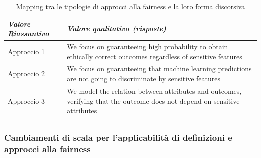      \begin{longtable}{| p{} | p{} |} 
      
      \hline\textbf{\textit{Valore Riassuntivo}} & \textbf{\textit{Valore qualitativo (risposte)}}
       
        
        \\ \hline
        \rowcolor{Gray}
        Approccio 1       
        
        &   We focus on guaranteeing high probability to obtain ethically correct outcomes regardless of sensitive features


        
        \\ \hline


        Approccio 2      
        
        &  We focus on guaranteeing that machine learning predictions are not going to discriminate by sensitive features





        \\ \hline
        \rowcolor{Gray}
        Approccio 3      
        
        &  We model the relation between attributes and outcomes, verifying that the outcome does not depend on sensitive attributes


        
        \\ \hline
        \caption{Mapping tra le tipologie di approcci alla  fairness e la loro forma discorsiva} %
        \label{tab:myfirstlongtable}
    \end{longtable}
    
    \subsubsection{Cambiamenti di scala per l'applicabilità di definizioni e approcci alla fairness}
    
    \begin{center}
		\hspace*{-5mm}%
	\end{center}
	
